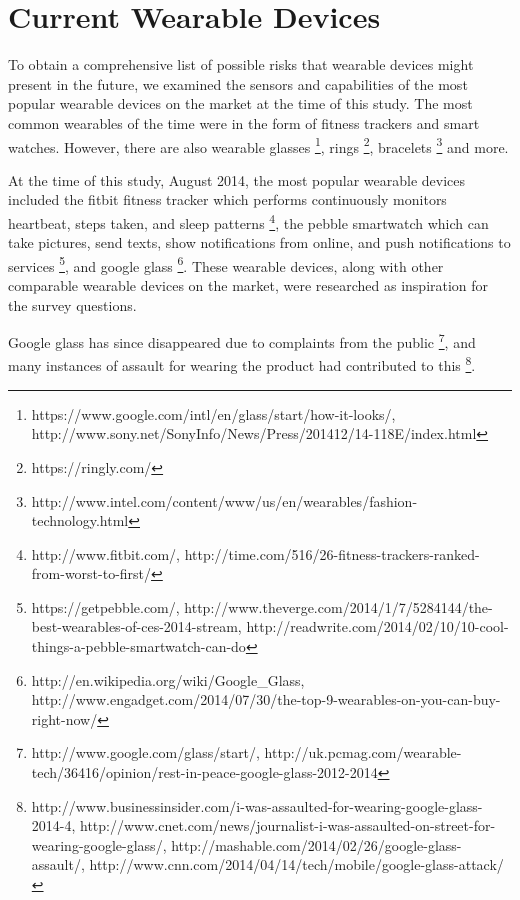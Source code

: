 \section{Current Wearable Devices}  %
To obtain a comprehensive list of possible risks that wearable devices might present in the future, we examined the sensors and capabilities of the most popular wearable devices on the market at the time of this study. The most common wearables of the time were in the form of fitness trackers and smart watches. However, there are also wearable glasses \footnote{ https://www.google.com/intl/en/glass/start/how-it-looks/, http://www.sony.net/SonyInfo/News/Press/201412/14-118E/index.html}, rings \footnote{https://ringly.com/}, bracelets \footnote{http://www.intel.com/content/www/us/en/wearables/fashion-technology.html} and more. 

 At the time of this study, August 2014, the most popular wearable devices included the fitbit fitness tracker which performs continuously monitors heartbeat, steps taken, and sleep patterns \footnote{http://www.fitbit.com/, http://time.com/516/26-fitness-trackers-ranked-from-worst-to-first/}, the pebble smartwatch which can take pictures, send texts, show notifications from online, and push notifications to services \footnote{https://getpebble.com/, http://www.theverge.com/2014/1/7/5284144/the-best-wearables-of-ces-2014-stream, http://readwrite.com/2014/02/10/10-cool-things-a-pebble-smartwatch-can-do}, and google glass \footnote{http://en.wikipedia.org/wiki/Google\_Glass, http://www.engadget.com/2014/07/30/the-top-9-wearables-on-you-can-buy-right-now/}. These wearable devices, along with other comparable wearable devices on the market, were researched as inspiration for the survey questions. 
 
 Google glass has since disappeared due to complaints from the public \footnote{http://www.google.com/glass/start/, http://uk.pcmag.com/wearable-tech/36416/opinion/rest-in-peace-google-glass-2012-2014}, and many instances of assault for wearing the product had contributed to this \footnote{http://www.businessinsider.com/i-was-assaulted-for-wearing-google-glass-2014-4, http://www.cnet.com/news/journalist-i-was-assaulted-on-street-for-wearing-google-glass/, http://mashable.com/2014/02/26/google-glass-assault/, http://www.cnn.com/2014/04/14/tech/mobile/google-glass-attack/}. 